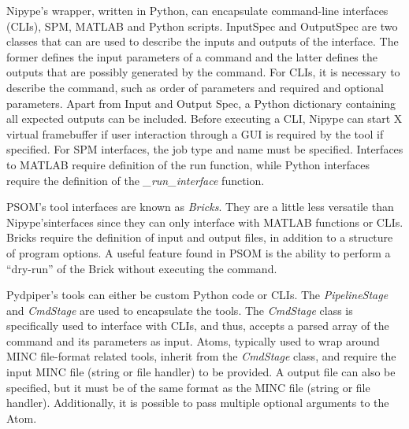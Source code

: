 \documentclass{report}
\begin{document}
            Nipype's wrapper, written in Python, can encapsulate command-line interfaces (CLIs), SPM, 
            MATLAB and Python scripts. InputSpec and OutputSpec are two classes 
            that can are used to describe the inputs and outputs of the 
            interface. The former defines the input parameters of 
            a command and the latter defines the outputs that are possibly 
            generated by the command. For CLIs, it is necessary to describe the
            command, such as order of parameters and required and optional parameters. 
            Apart from Input and Output Spec, a Python dictionary containing all
            expected outputs can be included.
            Before executing a CLI, Nipype can start X virtual framebuffer if 
            user interaction through a GUI is required by the tool if specified. 
            For SPM interfaces, the job 
            type and name must be specified. Interfaces to MATLAB require 
            definition of the run function, while Python interfaces require
            the definition of the \textit{\_run\_interface} function.
            
            PSOM’s tool interfaces are known as \textit{Bricks}. They are a 
            little less versatile than Nipype'sinterfaces since they can only
            interface with MATLAB functions or CLIs. Bricks require the 
            definition of input and output files, in addition to a structure of 
            program options. A useful feature found in PSOM is the ability to 
            perform a “dry-run” of the Brick without executing the command.

            Pydpiper's tools can either be custom Python code or CLIs. The 
            \textit{PipelineStage} and \textit{CmdStage} are used to 
            encapsulate the tools. The \textit{CmdStage} class is specifically 
            used to interface with CLIs, and thus, accepts a parsed array of the
            command and its parameters as input. Atoms, typically used to wrap
            around MINC file-format related tools, inherit from the
            \textit{CmdStage} class, and require the input MINC file (string or
            file handler) to be provided. A output file can also be specified, 
            but it must be of the same format as the MINC file (string or file 
            handler). Additionally, it is possible to pass multiple optional 
            arguments to the Atom.
\end{document}
